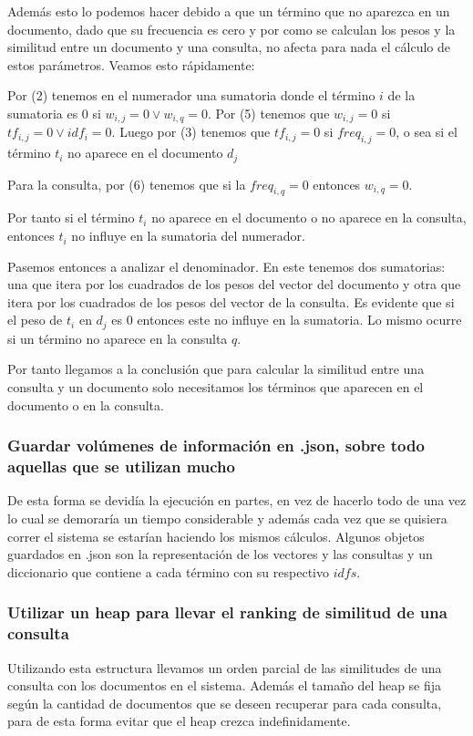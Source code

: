 \documentclass[runningheads]{llncs}
\begin{document}
	Adem\'as esto lo podemos hacer debido a que un t\'ermino que no aparezca en un documento, dado que su frecuencia es cero y por como se calculan los pesos y la similitud entre un documento y una consulta, no afecta para nada el c\'alculo de estos par\'ametros. Veamos esto r\'apidamente:
	
	Por (2) tenemos en el numerador una sumatoria donde el t\'ermino $i$ de la sumatoria es 0 si $w_{i,j}=0 \lor w_{i,q}=0$. Por (5) tenemos que $w_{i,j}=0$ si $tf_{i,j}=0 \lor idf_i=0$. Luego por (3) tenemos que $tf_{i,j}=0$ si $freq_{i,j}=0$, o sea si el t\'ermino $t_i$ no aparece en el documento $d_j$
	
	Para la consulta, por (6) tenemos que si la $freq_{i,q}=0$ entonces $w_{i,q}=0$.
	
	Por tanto si el t\'ermino $t_i$ no aparece en el documento o no aparece en la consulta, entonces $t_i$ no influye en la sumatoria del numerador.
	
	Pasemos entonces a analizar el denominador. En este tenemos dos sumatorias: una que itera por los cuadrados de los pesos del vector del documento y otra que itera por los cuadrados de los pesos del vector de la consulta. Es evidente que si el peso de $t_i$ en $d_j$ es 0 entonces este no influye en la sumatoria. Lo mismo ocurre si un t\'ermino no aparece en la consulta $q$.
	
	Por tanto llegamos a la conclusi\'on que para calcular la similitud entre una consulta y un documento solo necesitamos los t\'erminos que aparecen en el documento o en la consulta.
	
	 \subsubsection{Guardar volúmenes de informaci\'on en .json, sobre todo aquellas que se utilizan mucho} De esta forma se devid\'ia la ejecuci\'on en partes, en vez de hacerlo todo de una vez lo cual se demorar\'ia un tiempo considerable y adem\'as cada vez que se quisiera correr el sistema se estar\'ian haciendo los mismos c\'alculos. Algunos objetos guardados en .json son la representaci\'on de los vectores y las consultas y un diccionario que contiene a cada t\'ermino con su respectivo $idfs$.
	
	\subsubsection{Utilizar un heap para llevar el ranking de similitud de una consulta} Utilizando esta estructura llevamos un orden parcial de las similitudes de una consulta con los documentos en el sistema. Adem\'as el tama\~{n}o del heap se fija seg\'un la cantidad de documentos que se deseen recuperar para cada consulta, para de esta forma evitar que el heap crezca indefinidamente.
		
\end{document}
